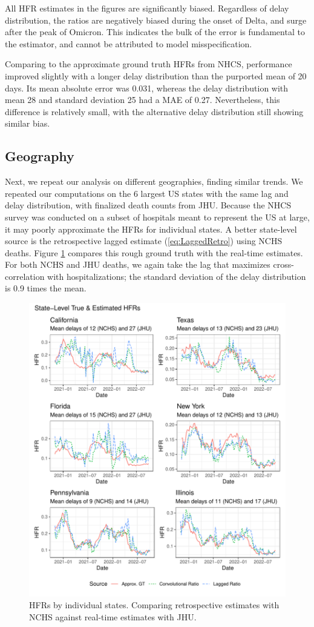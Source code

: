 \documentclass{article}
\begin{document}
All HFR estimates in the figures are significantly biased. Regardless of delay distribution, the ratios are negatively biased during the onset of Delta, and surge after the peak of Omicron. This indicates the bulk of the error is fundamental to the estimator, and cannot be attributed to model misspecification. 

Comparing to the approximate ground truth HFRs from NHCS, performance improved slightly with a longer delay distribution than the purported mean of 20 days. Its mean absolute error was 0.031, whereas the delay distribution with mean 28 and standard deviation 25 had a MAE of 0.27. Nevertheless, this difference is relatively small, with the alternative delay distribution still showing similar bias.

\subsection{Geography}

Next, we repeat our analysis on different geographies, finding similar trends. We repeated our computations on the 6 largest US states with the same lag and delay distribution, with finalized death counts from JHU. Because the NHCS survey was conducted on a subset of hospitals meant to represent the US at large, it may poorly approximate the HFRs for individual states. A better state-level source is the retrospective lagged estimate (\eqref{eq:LaggedRetro}) using NCHS deaths. Figure \ref{fig:state-level} compares this rough ground truth with the real-time estimates. For both NCHS and JHU deaths, we again take the lag that maximizes cross-correlation with hospitalizations; the standard deviation of the delay distribution is 0.9 times the mean. 

 \begin{figure}
     \centering
     \includegraphics[width=0.8\linewidth]{Figs/Real/state_level_hfrs.pdf}
     \caption{HFRs by individual states. Comparing retrospective estimates with NCHS against real-time estimates with JHU.}
     \label{fig:state-level}
 \end{figure}
\end{document}
